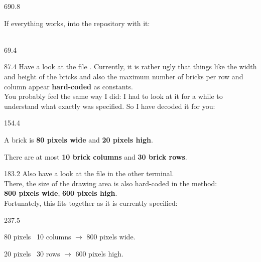 \documentclass{aslab}
\begin{document}
\begin{region}[pitch=13.3]{690.8}
\begin{plaintasks}[start=4]
\item If everything works, into the repository with it:\\
  \\
\end{plaintasks}
\end{region}

\nextpage
\begin{region}{69.4}
\end{region}

\begin{region}[pitch=13.5]{87.4}
Have a look at the file . Currently, it is rather ugly that
things like the width and height of the bricks and also the maximum number
of bricks per row and column appear \textbf{hard-coded} as constants.\\
You probably feel the same way I did: I had to look at it for a while to
understand what exactly was specified. So I have decoded it for you:
\end{region}

\begin{region}[pitch=14.2]{154.4}
\begin{dashlist}
\item A brick is \textbf{80 pixels wide} and \textbf{20 pixels high}.
\item There are at most \textbf{10 brick columns} and \textbf{30 brick
  rows}.
\end{dashlist}
\end{region}

\begin{region}[pitch=13.7]{183.2}
Also have a look at the file  in the other terminal.\\
There, the size of the drawing area is also hard-coded in the 
method:\\
\textbf{800 pixels wide}, \textbf{600 pixels high}.\\
Fortunately, this fits together as it is currently specified:
\end{region}

\begin{region}[pitch=14.7]{237.5}
\begin{dashlist}
\item 80 pixels \texttimes\ 10 columns $\rightarrow$ 800 pixels wide.
\item 20 pixels \texttimes\ 30 rows $\rightarrow$ 600 pixels high.
\end{dashlist}
\end{region}
\end{document}
